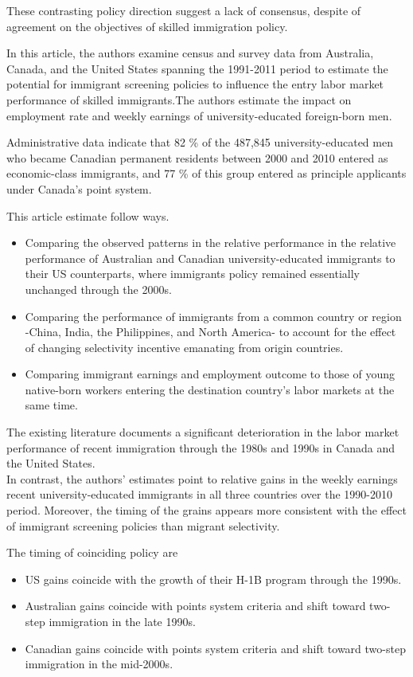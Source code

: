 \documentclass[../root]{subfiles}
\begin{document}
    
    These contrasting policy direction suggest a lack of consensus, despite of agreement on the objectives of skilled immigration policy.
    
    In this article, the authors examine census and survey data from Australia, Canada, and the United States spanning the 1991-2011 period to estimate the potential for immigrant screening policies to influence the entry labor market performance of skilled immigrants.The authors estimate the impact on employment rate and weekly earnings of university-educated foreign-born men.
    
    Administrative data indicate that 82 \% of the 487,845 university-educated men who became Canadian permanent residents between 2000 and 2010 entered as economic-class immigrants, and 77 \% of this group entered as principle applicants under Canada's point system.
    
    
    This article estimate follow ways.
    \begin{itemize}
        \item Comparing the observed patterns in the relative performance in the relative performance of Australian and Canadian university-educated immigrants to their US counterparts, where immigrants policy remained essentially unchanged through the 2000s.
        \item Comparing the performance of immigrants from a common country or region -China, India, the Philippines, and North America- to account for the effect of changing selectivity incentive emanating from origin countries.
        \item Comparing immigrant earnings and employment outcome to those of young native-born workers entering the destination country's labor markets at the same time.
    \end{itemize}
    
    The existing literature documents a significant deterioration in the labor market performance of recent immigration through the 1980s and 1990s in Canada and the United States.  \\
    In contrast, the authors' estimates point to relative gains in the weekly earnings recent university-educated immigrants in all three countries over the 1990-2010 period. Moreover, the timing of the grains appears more consistent with the effect of immigrant screening policies than migrant selectivity.
    
    The timing of coinciding policy are
    \begin{itemize}
        \item US gains coincide with the growth of their H-1B  program through the 1990s.
        \item Australian gains coincide with points system criteria and shift toward two-step immigration in the late 1990s.
        \item Canadian gains  coincide with points system criteria and shift toward two-step immigration in the mid-2000s.
    \end{itemize}
    
\end{document}
